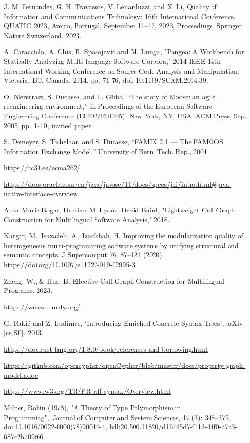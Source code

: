 \begin{thebibliography}{00}
    J. M. Fernandes, G. H. Travassos, V. Lenarduzzi, and X. Li, 
    Quality of Information and Communications Technology: 
    16th International Conference, QUATIC 2023,
    Aveiro, Portugal, September 11--13, 2023,
    Proceedings. Springer Nature Switzerland, 2023.

    A. Caracciolo, A. Chis, B. Spasojevic and
    M. Lungu, "Pangea: A Workbench for Statically Analyzing Multi-language Software Corpora,"
    2014 IEEE 14th International Working Conference on Source Code Analysis
    and Manipulation, Victoria, BC, Canada, 2014,
    pp. 71-76, doi: 10.1109/SCAM.2014.39.

    O. Nierstrasz, S. Ducasse, and T. Gîrba, “The story of Moose: an
    agile reengineering environment,” in Proceedings of the European
    Software Engineering Conference (ESEC/FSE’05). New York, NY,
    USA: ACM Press, Sep. 2005, pp. 1–10, invited paper.

    S. Demeyer, S. Tichelaar, and S. Ducasse, “FAMIX 2.1 — The FAMOOS
    Information Exchange Model,” University of Bern, Tech. Rep., 2001

    \url{https://tc39.es/ecma262/}

    \url{https://docs.oracle.com/en/java/javase/11/docs/specs/jni/intro.html#java-native-interface-overview}

    Anne Marie Bogar, Damian M. Lyons, David Baird,
    "Lightweight Call-Graph Construction for Multilingual Software Analysis," 2018.

    Kargar, M., Isazadeh, A., Izadkhah, H.
    Improving the modularization quality of heterogeneous multi-programming software systems by unifying structural and semantic concepts.
    J Supercomput 76, 87–121 (2020). \url{https://doi.org/10.1007/s11227-019-02995-3}

    Zheng, W., \& Hua, B. Effective Call Graph Construction for Multilingual Programs. 2023.

    \url{https://webassembly.org/}

    G. Rakić and Z. Budimac, ‘Introducing Enriched Concrete Syntax Trees’, arXiv [cs.SE]. 2013.

    \url{https://doc.rust-lang.org/1.8.0/book/references-and-borrowing.html}

    \url{https://github.com/opencypher/openCypher/blob/master/docs/property-graph-model.adoc}

    \url{https://www.w3.org/TR/PR-rdf-syntax/Overview.html}

    Milner, Robin (1978), "A Theory of Type Polymorphism in Programming",\
    Journal of Computer and System Sciences, 17 (3): 348–375,
    doi:10.1016/0022-0000(78)90014-4, hdl:20.500.11820/d16745d7-f113-44f0-a7a3-687c2b709f66

\end{thebibliography}
\endgroup

\clearpage
